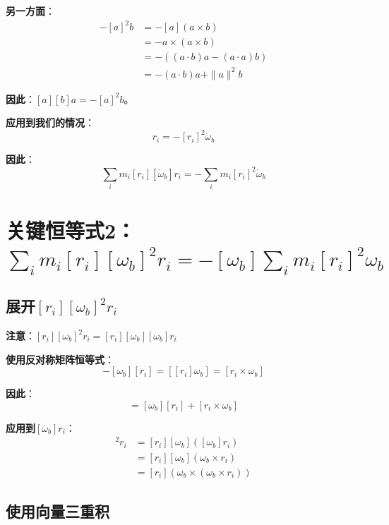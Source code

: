 \documentclass[12pt,a4paper]{article}
\begin{document}
\textbf{另一方面}：
\begin{align}
-[a]^2 b &= -[a](a \times b) \\
&= -a \times (a \times b) \\
&= -((a \cdot b) a - (a \cdot a) b) \\
&= -(a \cdot b) a + \|a\|^2 b
\end{align}

\textbf{因此}：$[a][b] a = -[a]^2 b$。

\textbf{应用到我们的情况}：
\begin{equation}
[r_i][\dot{\omega}_b] r_i = -[r_i]^2 \dot{\omega}_b
\end{equation}

\textbf{因此}：
\begin{equation}
\sum_i m_i [r_i][\dot{\omega}_b] r_i = -\sum_i m_i [r_i]^2 \dot{\omega}_b
\end{equation}

\section{关键恒等式2：$\sum_i m_i [r_i][\omega_b]^2 r_i = -[\omega_b] \sum_i m_i [r_i]^2 \omega_b$}

\subsection{展开$[r_i][\omega_b]^2 r_i$}

\textbf{注意}：$[r_i][\omega_b]^2 r_i = [r_i][\omega_b][\omega_b] r_i$

\textbf{使用反对称矩阵恒等式}：
\begin{equation}
[r_i][\omega_b] - [\omega_b][r_i] = [[r_i]\omega_b] = [r_i \times \omega_b]
\end{equation}

\textbf{因此}：
\begin{equation}
[r_i][\omega_b] = [\omega_b][r_i] + [r_i \times \omega_b]
\end{equation}

\textbf{应用到$[\omega_b] r_i$}：
\begin{align}
[r_i][\omega_b]^2 r_i &= [r_i][\omega_b]([\omega_b] r_i) \\
&= [r_i][\omega_b](\omega_b \times r_i) \\
&= [r_i](\omega_b \times (\omega_b \times r_i))
\end{align}

\subsection{使用向量三重积}
\end{document}
